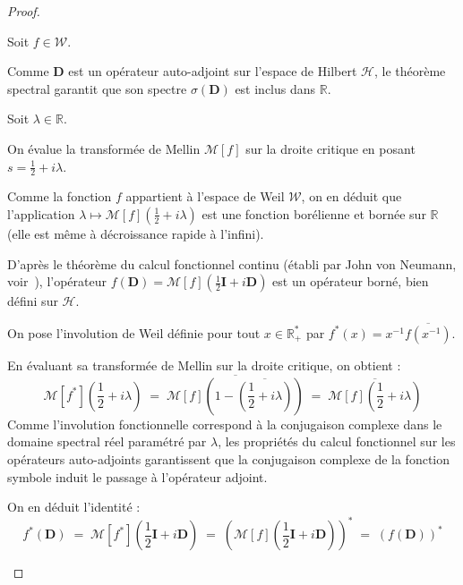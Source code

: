 \documentclass[Riemann_Hypothesis.tex]{subfiles}
\begin{document}
\begin{proof}
\begin{part_proof}
    \end{part_proof}
    \begin{part_proof}
        Soit $f \in \mathcal{W}$. \par
        Comme $\mathbf{D}$ est un opérateur auto-adjoint sur l'espace de Hilbert $\mathcal{H}$, le théorème spectral garantit que son spectre $\sigma(\mathbf{D})$ est inclus dans $\mathbb{R}$. \par
        Soit $\lambda \in \mathbb{R}$. \par
        On évalue la transformée de Mellin $\mathcal{M}[f]$ sur la droite critique en posant $s = \frac{1}{2} + i\lambda$. \par
        Comme la fonction $f$ appartient à l'espace de Weil $\mathcal{W}$, on en déduit que l'application $\lambda \mapsto \mathcal{M}[f]\left(\frac{1}{2} + i\lambda\right)$ est une fonction borélienne et bornée sur $\mathbb{R}$ (elle est même à décroissance rapide à l'infini). \par
        D'après le théorème du calcul fonctionnel continu (établi par John von Neumann, voir~\cite{vonneumann_quantum}), l'opérateur $f(\mathbf{D}) = \mathcal{M}[f]\left(\frac{1}{2}\mathbf{I} + i\mathbf{D}\right)$ est un opérateur borné, bien défini sur $\mathcal{H}$. \par
        On pose l'involution de Weil définie pour tout $x \in \mathbb{R}_+^*$ par $f^*(x) = x^{-1} \overline{f(x^{-1})}$. \par
        En évaluant sa transformée de Mellin sur la droite critique, on obtient :
        \begin{equation*}
            \mathcal{M}[f^*]\left(\frac{1}{2} + i\lambda\right) \;=\; \overline{\mathcal{M}[f]\left(1 - \overline{\left(\frac{1}{2} + i\lambda\right)}\right)} \;=\; \overline{\mathcal{M}[f]\left(\frac{1}{2} + i\lambda\right)}
        \end{equation*}
        Comme l'involution fonctionnelle correspond à la conjugaison complexe dans le domaine spectral réel paramétré par $\lambda$, les propriétés du calcul fonctionnel sur les opérateurs auto-adjoints garantissent que la conjugaison complexe de la fonction symbole induit le passage à l'opérateur adjoint. \par
        On en déduit l'identité :
        \begin{equation*}
            f^*(\mathbf{D}) \;=\; \mathcal{M}[f^*]\left(\frac{1}{2}\mathbf{I} + i\mathbf{D}\right) \;=\; \left( \mathcal{M}[f]\left(\frac{1}{2}\mathbf{I} + i\mathbf{D}\right) \right)^* \;=\; (f(\mathbf{D}))^*
        \end{equation*}

\end{part_proof}
\end{proof}
\end{document}
